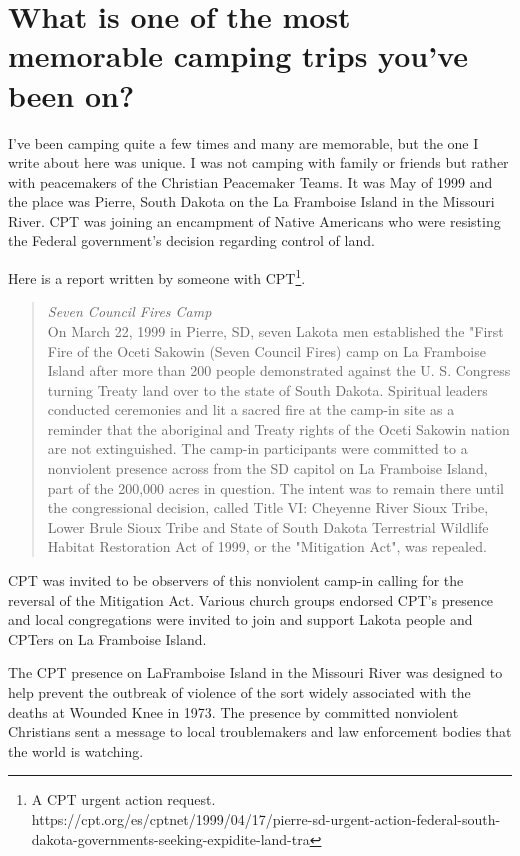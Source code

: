 \section{What is one of the most memorable camping trips you've been on?}
I've been camping quite a few times and many are memorable, but the one I write about here was unique.
I was not camping with family or friends but rather with peacemakers of the Christian Peacemaker Teams.
It was May of 1999 and the place was Pierre, South Dakota on the La Framboise Island in the Missouri River.
CPT was joining an encampment of Native Americans who were resisting the Federal government's decision regarding control of land.

Here is a report written by someone with CPT\footnote{A CPT urgent action request.\\
https://cpt.org/es/cptnet/1999/04/17/pierre-sd-urgent-action-federal-south-dakota-governments-seeking-expidite-land-tra}.

\begin{quotation}
\emph{Seven Council Fires Camp} \\
On March 22, 1999 in Pierre, SD, seven Lakota men established the "First Fire of the Oceti Sakowin (Seven Council Fires) camp on La Framboise Island after more than 200 people demonstrated against the U.
S.
Congress turning Treaty land over to the state of South Dakota.
Spiritual leaders conducted ceremonies and lit a sacred fire at the camp-in site as a reminder that the aboriginal and Treaty rights of the Oceti Sakowin nation are not extinguished.
The camp-in participants were committed to a nonviolent presence across from the SD capitol on La Framboise Island, part of the 200,000 acres in question.
The intent was to remain there until the congressional decision, called Title VI: Cheyenne River Sioux Tribe, Lower Brule Sioux Tribe and State of South Dakota Terrestrial Wildlife Habitat Restoration Act of 1999, or the "Mitigation Act", was repealed.
\end{quotation}

CPT was invited to be observers of this nonviolent camp-in calling for the reversal of the Mitigation Act.
Various church groups endorsed CPT's presence and local congregations were invited to join and support Lakota people and CPTers on La Framboise Island.

The CPT presence on LaFramboise Island in the Missouri River was designed to help prevent the outbreak of violence of the sort widely associated with the deaths at Wounded Knee in 1973.
The presence by committed nonviolent Christians sent a message to local troublemakers and law enforcement bodies that the world is watching.


